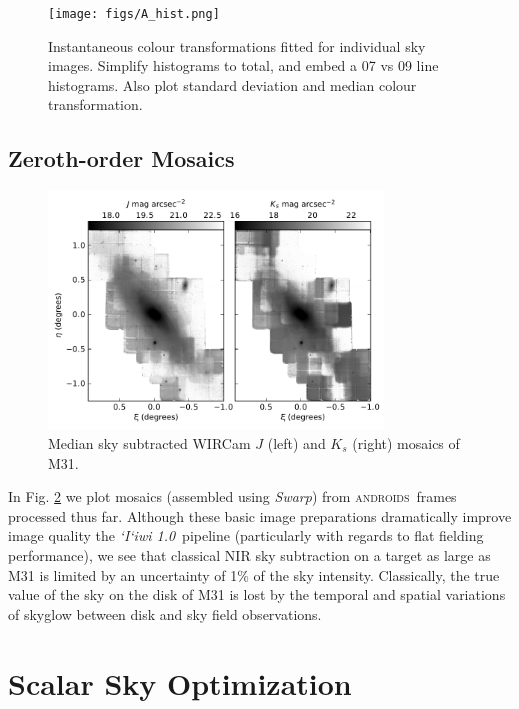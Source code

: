 \documentclass[iop]{emulateapj}
\newcommand{\sw}[1]{\textit{#1}} %
\newcommand{\iiwione}{\sw{`I`iwi 1.0}}
\newcommand{\androids}{\textsc{androids}}
\newcommand{\todo}[1]{\textcolor{RedOrange}{#1}} %
\begin{document}
\begin{figure}[t]
 \centering
     \texttt{[image: figs/A\_hist.png]}
 \caption{Instantaneous colour transformations fitted for individual sky images.
 \todo{Simplify histograms to total, and embed a 07 vs 09 line histograms.
 Also plot standard deviation and median colour transformation.}}
 \label{fig:colourtrans}
\end{figure}

\subsection{Zeroth-order Mosaics}
\label{sec:rawmosaic}

\begin{figure}[t]
	\centering
		\includegraphics[width=3.5in]{figs/raw_mosaics}
	\caption{Median sky subtracted WIRCam $J$ (left) and $K_s$ (right) mosaics of M31.}
	\label{fig:raw_mosaics}
\end{figure}

In Fig. \ref{fig:raw_mosaics} we plot mosaics (assembled using \sw{Swarp}) from \androids\ frames processed thus far. Although these basic image preparations dramatically improve image quality the \iiwione\ pipeline (particularly with regards to flat fielding performance), we see that classical NIR sky subtraction on a target as large as M31 is limited by an uncertainty of 1\% of the sky intensity. Classically, the true value of the sky on the disk of M31 is lost by the temporal and spatial variations of skyglow between disk and sky field observations.

\section{Scalar Sky Optimization}
\label{sec:scalar}
\end{document}
